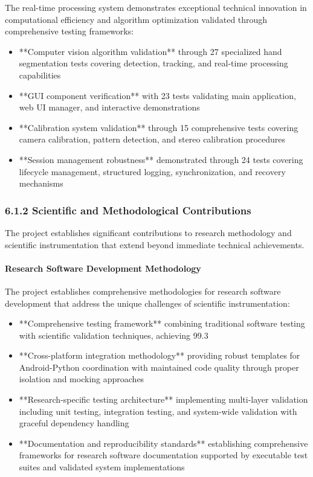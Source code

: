 \documentclass[12pt,a4paper]{article}
\begin{document}
The real-time processing system demonstrates exceptional technical innovation in computational efficiency and algorithm
optimization validated through comprehensive testing frameworks:

\begin{itemize}
\item **Computer vision algorithm validation** through 27 specialized hand segmentation tests covering detection, 
  tracking, and real-time processing capabilities
\item **GUI component verification** with 23 tests validating main application, web UI manager, and interactive 
  demonstrations
\item **Calibration system validation** through 15 comprehensive tests covering camera calibration, pattern detection, 
  and stereo calibration procedures
\item **Session management robustness** demonstrated through 24 tests covering lifecycle management, structured logging, 
  synchronization, and recovery mechanisms

\end{itemize}
\subsubsection{6.1.2 Scientific and Methodological Contributions}

The project establishes significant contributions to research methodology and scientific instrumentation that extend
beyond immediate technical achievements.

\paragraph{Research Software Development Methodology}

The project establishes comprehensive methodologies for research software development that address the unique challenges
of scientific instrumentation:

\begin{itemize}
\item **Comprehensive testing framework** combining traditional software testing with scientific validation techniques, 
  achieving 99.3%
\item **Cross-platform integration methodology** providing robust templates for Android-Python coordination with 
  maintained code quality through proper isolation and mocking approaches
\item **Research-specific testing architecture** implementing multi-layer validation including unit testing, 
  integration testing, and system-wide validation with graceful dependency handling
\item **Documentation and reproducibility standards** establishing comprehensive frameworks for research software 
  documentation supported by executable test suites and validated system implementations

\end{itemize}
\end{document}
